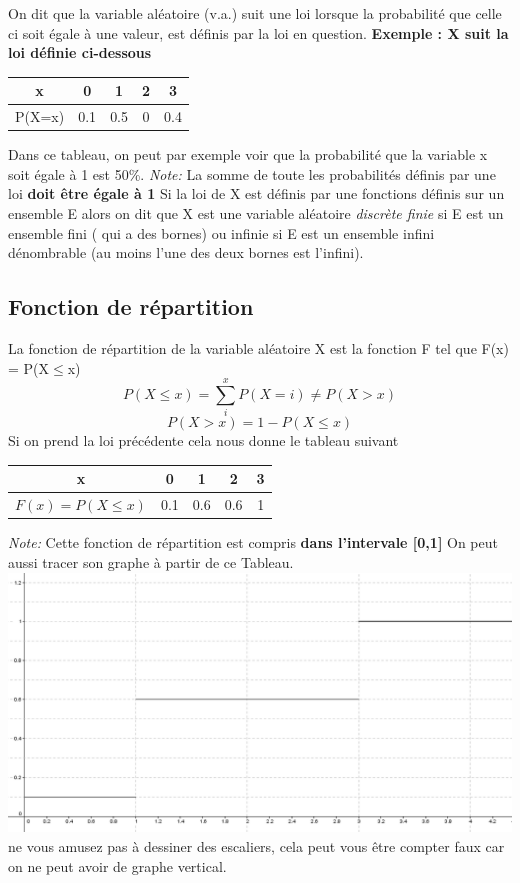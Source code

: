 \documentclass[a4paper]{article}
\begin{document}
{\raggedright On dit que la variable aléatoire (v.a.) suit une loi lorsque la probabilité que celle ci soit égale à une valeur, est définis par la loi en question.\newline
\textbf{Exemple : X suit la loi définie ci-dessous}\par}
{\centering
\begin{tabular}{|c|c|c|c|c|}
\hline
x & 0 & 1 & 2 & 3 \\
\hline
P(X=x) & 0.1 & 0.5 & 0 & 0.4 \\
\hline
\end{tabular}
\par}
Dans ce tableau, on peut par exemple voir que la probabilité que la variable x soit égale à 1 est 50\%. 
\textit{Note:} La somme de toute les probabilités définis par une loi \textbf{ doit être égale à 1}
\newline
Si la loi de X est définis par une fonctions définis sur un ensemble E alors on dit que X est une variable aléatoire \emph{discrète finie} si E est un ensemble fini ( qui a des bornes) ou infinie si E est un ensemble infini dénombrable (au moins l'une des deux bornes est l'infini).
\subsection{Fonction de répartition}

La fonction de répartition de la variable aléatoire X est la fonction F tel que F(x) = P(X$\leq$x)
$$ P(X\leq x)= \sum_i^x P(X=i) \neq P(X>x)$$ 
$$P(X>x) = 1 - P(X\leq x)$$
Si on prend la loi précédente cela nous donne le tableau suivant
{\centering
\begin{tabular}{|c|c|c|c|c|}
\hline
x & 0 & 1 & 2 & 3 \\
\hline
$ F(x) = P(X \leq x) $ & 0.1 & 0.6 & 0.6 & 1 \\
\hline
\end{tabular}
\par}
\textit{Note:} Cette fonction de répartition est compris \textbf{dans l'intervale [0,1]}
\newline On peut aussi tracer son graphe à partir de ce Tableau.
\newline
\includegraphics[scale=0.5]{Graph1.png}
\newline
ne vous amusez pas à dessiner des escaliers, cela peut vous être compter faux car on ne peut avoir de graphe vertical.
\end{document}
